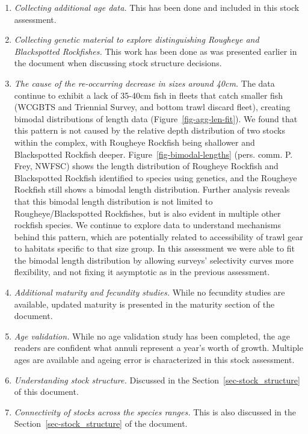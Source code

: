 \documentclass[
]{scrartcl}
\providecommand{\tightlist}{%
  \setlength{\itemsep}{0pt}\setlength{\parskip}{0pt}}\usepackage{longtable,booktabs,array}
\begin{document}
\begin{enumerate}
\def\labelenumi{\arabic{enumi}.}
\tightlist
\item
  \emph{Collecting additional age data.} This has been done and included
  in this stock assessment.
\item
  \emph{Collecting genetic material to explore distinguishing Rougheye
  and Blackspotted Rockfishes.} This work has been done as was presented
  earlier in the document when discussing stock structure decisions.
\item
  \emph{The cause of the re-occurring decrease in sizes around 40cm.}
  The data continue to exhibit a lack of 35-40cm fish in fleets that
  catch smaller fish (WCGBTS and Triennial Survey, and bottom trawl
  discard fleet), creating bimodal distributions of length data
  (Figure~\ref{fig-agg-len-fit}). We found that this pattern is not
  caused by the relative depth distribution of two stocks within the
  complex, with Rougheye Rockfish being shallower and Blackspotted
  Rockfish deeper. Figure~\ref{fig-bimodal-lengths} (pers. comm. P.
  Frey, NWFSC) shows the length distribution of Rougheye Rockfish and
  Blackspotted Rockfish identified to species using genetics, and the
  Rougheye Rockfish still shows a bimodal length distribution. Further
  analysis reveals that this bimodal length distribution is not limited
  to Rougheye/Blackspotted Rockfishes, but is also evident in multiple
  other rockfish species. We continue to explore data to understand
  mechanisms behind this pattern, which are potentially related to
  accessibility of trawl gear to habitats specific to that size group.
  In this assessment we were able to fit the bimodal length distribution
  by allowing surveys' selectivity curves more flexibility, and not
  fixing it asymptotic as in the previous assessment.
\item
  \emph{Additional maturity and fecundity studies.} While no fecundity
  studies are available, updated maturity is presented in the maturity
  section of the document.
\item
  \emph{Age validation.} While no age validation study has been
  completed, the age readers are confident what annuli represent a
  year's worth of growth. Multiple ages are available and ageing error
  is characterized in this stock assessment.
\item
  \emph{Understanding stock structure.} Discussed in the
  Section~\ref{sec-stock_structure} of this document.
\item
  \emph{Connectivity of stocks across the species ranges.} This is also
  discussed in the Section~\ref{sec-stock_structure} of the document.
\end{enumerate}
\end{document}
